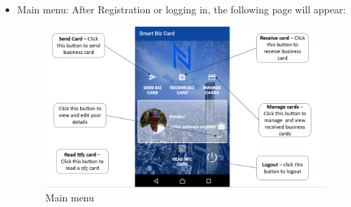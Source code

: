 \documentclass[english]{article}
\begin{document}
	\begin{itemize}
		\item Main menu:
		\subitem After Registration or logging in, the following page will appear:
		
		\begin{figure}[H]
			\centering
			\includegraphics[scale=0.7]{menu.png}
			\caption{Main menu}
			\label{figure: 3}
		\end{figure}
	\end{itemize}
\end{document}
